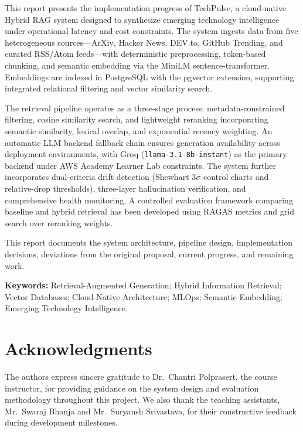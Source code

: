 \documentclass[12pt,a4paper]{report}
\begin{document}
This report presents the implementation progress of TechPulse, a cloud-native Hybrid RAG system designed to synthesize emerging technology intelligence under operational latency and cost constraints. The system ingests data from five heterogeneous sources---ArXiv, Hacker News, DEV.to, GitHub Trending, and curated RSS/Atom feeds---with deterministic preprocessing, token-based chunking, and semantic embedding via the MiniLM sentence-transformer. Embeddings are indexed in PostgreSQL with the pgvector extension, supporting integrated relational filtering and vector similarity search.

The retrieval pipeline operates as a three-stage process: metadata-constrained filtering, cosine similarity search, and lightweight reranking incorporating semantic similarity, lexical overlap, and exponential recency weighting. An automatic LLM backend fallback chain ensures generation availability across deployment environments, with Groq (\texttt{llama-3.1-8b-instant}) as the primary backend under AWS Academy Learner Lab constraints. The system further incorporates dual-criteria drift detection (Shewhart $3\sigma$ control charts and relative-drop thresholds), three-layer hallucination verification, and comprehensive health monitoring. A controlled evaluation framework comparing baseline and hybrid retrieval has been developed using RAGAS metrics and grid search over reranking weights.

This report documents the system architecture, pipeline design, implementation decisions, deviations from the original proposal, current progress, and remaining work.

\medskip
\noindent\textbf{Keywords:} Retrieval-Augmented Generation; Hybrid Information Retrieval; Vector Databases; Cloud-Native Architecture; MLOps; Semantic Embedding; Emerging Technology Intelligence.

\chapter*{Acknowledgments}

The authors express sincere gratitude to Dr.\ Chantri Polprasert, the course instructor, for providing guidance on the system design and evaluation methodology throughout this project. We also thank the teaching assistants, Mr.\ Swaraj Bhanja and Mr.\ Suryansh Srivastava, for their constructive feedback during development milestones.
\end{document}
